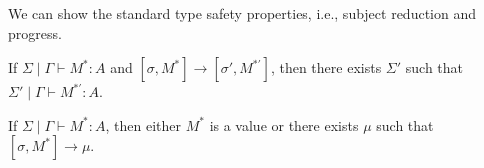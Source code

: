 We can show the standard type safety properties, i.e., subject reduction and progress.
\begin{thm}
  If $\Sigma\mid\Gamma \vdash M^* : A$ and $[\sigma,M^*] \to [\sigma',M^{*'}]$,
  then there exists $\Sigma'$ such that $\Sigma' \mid \Gamma \vdash M^{*'} : A$.
\end{thm}

\begin{thm}[Progress]
  If $\Sigma \mid \Gamma \vdash M^* : A$,
  then either $M^*$ is a value or there exists $\mu$ such that $[\sigma,M^*] \to \mu$.

\end{thm}
